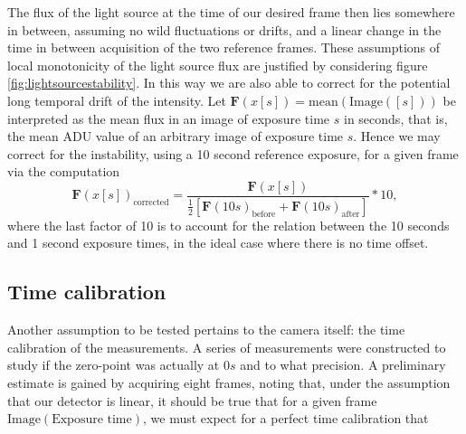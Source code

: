 \documentclass[../main.tex]{subfiles}
\begin{document}
		The flux of the light source at the time of our desired frame then lies somewhere in between, assuming no wild fluctuations or drifts, and a linear change in the time in between acquisition of the two reference frames. These assumptions of local monotonicity of the light source flux are justified by considering figure \ref{fig:lightsourcestability}. In this way we are also able to correct for the potential long temporal drift of the intensity. Let $\bm F(x[s]) = \text{mean}\left(\text{Image}([s])\right)$ be interpreted as the mean flux in an image of exposure time $s$ in seconds, that is, the mean ADU value of an arbitrary image of exposure time $s$. Hence we may correct for the instability, using a 10 second reference exposure, for a given frame via the computation
		\begin{equation}\label{eq:fluxcorrect_notimecal}
			\bm F(x [s])_\text{corrected} = \frac{\bm F(x [s])}{\frac12\left[\bm F(10s)_\text{before}+\bm F(10s)_\text{after}\right]} * 10,
		\end{equation}
		where the last factor of 10 is to account for the relation between the 10 seconds and 1 second exposure times, in the ideal case where there is no time offset.
		
		\subsection{Time calibration}
	Another assumption to be tested pertains to the camera itself: the time calibration of the measurements. A series of measurements were constructed to study if the zero-point was actually at $0s$ and to what precision. A preliminary estimate is gained by acquiring eight frames, noting that, under the assumption that our detector is linear, it should be true that for a given frame $\text{Image}(\text{Exposure time})$, we must expect for a perfect time calibration that 
	
\end{document}
